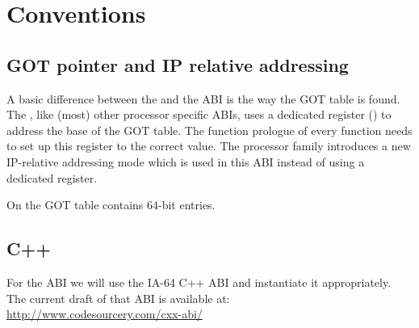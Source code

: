 \chapter{Conventions}



\section{GOT pointer and IP relative addressing}

A basic difference between the \intelabi and the \xARCH ABI is the
way the GOT table is found.  The \intelabi, like (most) other processor
specific ABIs, uses a dedicated register () to address the
base of the GOT table.  The function prologue of every function needs
to set up this register to the correct value.  The \xARCH processor
family introduces a new IP-relative addressing mode which is used in
this ABI instead of using a dedicated register.

On \xARCH the GOT table contains 64-bit entries.


\section{C++\label{section-cpp}}

For the  ABI we will use the IA-64 C++ ABI and instantiate it
appropriately.  The current draft of that ABI is available at:\\
\url{http://www.codesourcery.com/cxx-abi/}



